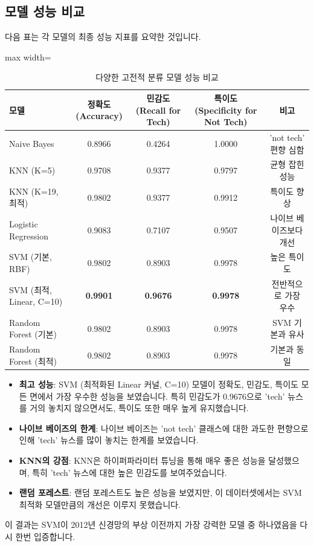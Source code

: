 \documentclass[11pt,a4paper]{article}
\theoremstyle{definition}
\begin{document}
\subsection{모델 성능 비교}

다음 표는 각 모델의 최종 성능 지표를 요약한 것입니다.

\begin{table}[h!]
\centering
\caption{다양한 고전적 분류 모델 성능 비교}
\label{tab:model_comparison}
\begin{adjustbox}{max width=\textwidth}
\begin{tabular}{lcccc}
\toprule
\textbf{모델} & \textbf{정확도 (Accuracy)} & \textbf{민감도 (Recall for Tech)} & \textbf{특이도 (Specificity for Not Tech)} & \textbf{비고} \\
\midrule
Naive Bayes & 0.8966 & 0.4264 & 1.0000 & 'not tech' 편향 심함 \\
KNN (K=5) & 0.9708 & 0.9377 & 0.9797 & 균형 잡힌 성능 \\
KNN (K=19, 최적) & 0.9802 & 0.9377 & 0.9912 & 특이도 향상 \\
Logistic Regression & 0.9083 & 0.7107 & 0.9507 & 나이브 베이즈보다 개선 \\
SVM (기본, RBF) & 0.9802 & 0.8903 & 0.9978 & 높은 특이도 \\
SVM (최적, Linear, C=10) & \textbf{0.9901} & \textbf{0.9676} & \textbf{0.9978} & 전반적으로 가장 우수 \\
Random Forest (기본) & 0.9802 & 0.8903 & 0.9978 & SVM 기본과 유사 \\
Random Forest (최적) & 0.9802 & 0.8903 & 0.9978 & 기본과 동일 \\
\bottomrule
\end{tabular}
\end{adjustbox}
\end{table}

\begin{infobox}[title={모델 비교 결론}]
\begin{itemize}
    \item \textbf{최고 성능}: SVM (최적화된 Linear 커널, C=10) 모델이 정확도, 민감도, 특이도 모든 면에서 가장 우수한 성능을 보였습니다. 특히 민감도가 0.9676으로 'tech' 뉴스를 거의 놓치지 않으면서도, 특이도 또한 매우 높게 유지했습니다.
    \item \textbf{나이브 베이즈의 한계}: 나이브 베이즈는 'not tech' 클래스에 대한 과도한 편향으로 인해 'tech' 뉴스를 많이 놓치는 한계를 보였습니다.
    \item \textbf{KNN의 강점}: KNN은 하이퍼파라미터 튜닝을 통해 매우 좋은 성능을 달성했으며, 특히 'tech' 뉴스에 대한 높은 민감도를 보여주었습니다.
    \item \textbf{랜덤 포레스트}: 랜덤 포레스트도 높은 성능을 보였지만, 이 데이터셋에서는 SVM 최적화 모델만큼의 개선은 이루지 못했습니다.
\end{itemize}
이 결과는 SVM이 2012년 신경망의 부상 이전까지 가장 강력한 모델 중 하나였음을 다시 한번 입증합니다.
\end{infobox}
\end{document}
